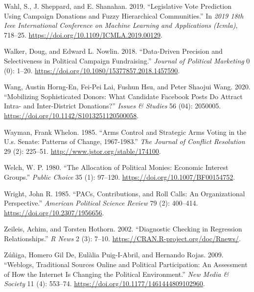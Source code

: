 \documentclass[12pt,]{article}
\begin{document}
\leavevmode\hypertarget{ref-wahl2019}{}%
Wahl, S., J. Sheppard, and E. Shanahan. 2019. ``Legislative Vote
Prediction Using Campaign Donations and Fuzzy Hierarchical
Communities.'' In \emph{2019 18th Ieee International Conference on
Machine Learning and Applications (Icmla)}, 718--25.
\url{https://doi.org/10.1109/ICMLA.2019.00129}.

\leavevmode\hypertarget{ref-walker2018}{}%
Walker, Doug, and Edward L. Nowlin. 2018. ``Data-Driven Precision and
Selectiveness in Political Campaign Fundraising.'' \emph{Journal of
Political Marketing} 0 (0): 1--20.
\url{https://doi.org/10.1080/15377857.2018.1457590}.

\leavevmode\hypertarget{ref-wang2020}{}%
Wang, Austin Horng-En, Fei-Pei Lai, Fushun Hsu, and Peter Shaojui Wang.
2020. ``Mobilizing Sophisticated Donors: What Candidate Facebook Posts
Do Attract Intra- and Inter-District Donations?'' \emph{Issues \&
Studies} 56 (04): 2050005.
\url{https://doi.org/10.1142/S1013251120500058}.

\leavevmode\hypertarget{ref-wayman1985}{}%
Wayman, Frank Whelon. 1985. ``Arms Control and Strategic Arms Voting in
the U.s. Senate: Patterns of Change, 1967-1983.'' \emph{The Journal of
Conflict Resolution} 29 (2): 225--51.
\url{http://www.jstor.org/stable/174100}.

\leavevmode\hypertarget{ref-welch1980}{}%
Welch, W. P. 1980. ``The Allocation of Political Monies: Economic
Interest Groups.'' \emph{Public Choice} 35 (1): 97--120.
\url{https://doi.org/10.1007/BF00154752}.

\leavevmode\hypertarget{ref-wright1985}{}%
Wright, John R. 1985. ``PACs, Contributions, and Roll Calls: An
Organizational Perspective.'' \emph{American Political Science Review}
79 (2): 400--414. \url{https://doi.org/10.2307/1956656}.

\leavevmode\hypertarget{ref-lmtest}{}%
Zeileis, Achim, and Torsten Hothorn. 2002. ``Diagnostic Checking in
Regression Relationships.'' \emph{R News} 2 (3): 7--10.
\url{https://CRAN.R-project.org/doc/Rnews/}.

\leavevmode\hypertarget{ref-dezuniga2009}{}%
Zúñiga, Homero Gil De, Eulàlia Puig-I-Abril, and Hernando Rojas. 2009.
``Weblogs, Traditional Sources Online and Political Participation: An
Assessment of How the Internet Is Changing the Political Environment.''
\emph{New Media \& Society} 11 (4): 553--74.
\url{https://doi.org/10.1177/1461444809102960}.





\newpage
\singlespacing 
\end{document}

